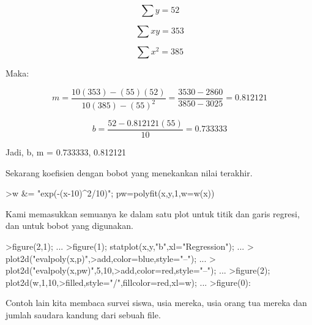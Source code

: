 \documentclass[a4paper,10pt]{article}
\begin{document}
\begin{eulernotebook}
\begin{eulercomment}
\begin{eulercomment}
\begin{eulerformula}
\[
\sum y = 52
\]
\end{eulerformula}
\begin{eulerformula}
\[
\sum xy = 353
\]
\end{eulerformula}
\begin{eulerformula}
\[
\sum x^2 = 385
\]
\end{eulerformula}
\begin{eulercomment}
Maka:\\
\end{eulercomment}
\begin{eulerformula}
\[
m = \frac{10 (353) - (55)(52)}{10 (385) - (55)^2} = \frac {3530-2860}{3850-3025} = 0.812121
\]
\end{eulerformula}
\begin{eulerformula}
\[
b = \frac{52 - 0.812121 (55)}{10}=0.733333
\]
\end{eulerformula}
\begin{eulercomment}
Jadi, b, m = 0.733333, 0.812121


Sekarang koefisien dengan bobot yang menekankan nilai terakhir.
\end{eulercomment}
\begin{eulerprompt}
>w &= "exp(-(x-10)^2/10)"; pw=polyfit(x,y,1,w=w(x))
\end{eulerprompt}
\begin{euleroutput}
  [4.71566,  0.38319]
\end{euleroutput}
\begin{eulercomment}
Kami memasukkan semuanya ke dalam satu plot untuk titik dan garis
regresi, dan untuk bobot yang digunakan.
\end{eulercomment}
\begin{eulerprompt}
>figure(2,1);  ...
>figure(1); statplot(x,y,"b",xl="Regression"); ...
>  plot2d("evalpoly(x,p)",>add,color=blue,style="--"); ...
>  plot2d("evalpoly(x,pw)",5,10,>add,color=red,style="--"); ...
>figure(2); plot2d(w,1,10,>filled,style="/",fillcolor=red,xl=w); ...
>figure(0):
\end{eulerprompt}
\begin{eulercomment}
Contoh lain kita membaca survei siswa, usia mereka, usia orang tua
mereka dan jumlah saudara kandung dari sebuah file.


\end{eulercomment}
\end{eulercomment}
\end{eulercomment}
\end{eulernotebook}
\end{document}
